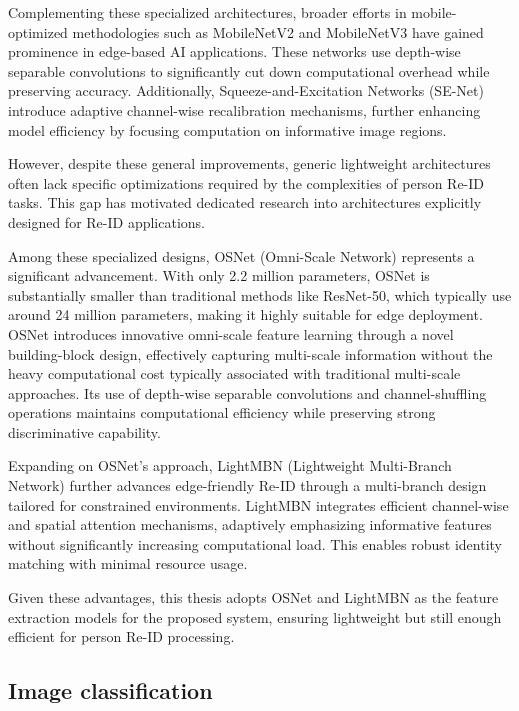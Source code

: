 \documentclass[../main.tex]{subfiles}
\begin{document}
Complementing these specialized architectures, broader efforts in mobile-optimized methodologies such as MobileNetV2 \cite{sandler2019mobilenetv2invertedresidualslinear} and MobileNetV3 \cite{howard2019searchingmobilenetv3} have gained prominence in edge-based AI applications. These networks use depth-wise separable convolutions to significantly cut down computational overhead while preserving accuracy. Additionally, Squeeze-and-Excitation Networks (SE-Net) \cite{hu2019squeezeandexcitationnetworks} introduce adaptive channel-wise recalibration mechanisms, further enhancing model efficiency by focusing computation on informative image regions.

However, despite these general improvements, generic lightweight architectures often lack specific optimizations required by the complexities of person Re-ID tasks. This gap has motivated dedicated research into architectures explicitly designed for Re-ID applications.

Among these specialized designs, OSNet (Omni-Scale Network) \cite{zhou2019omniscalefeaturelearningperson} represents a significant advancement. With only 2.2 million parameters, OSNet is substantially smaller than traditional methods like ResNet-50, which typically use around 24 million parameters, making it highly suitable for edge deployment. OSNet introduces innovative omni-scale feature learning through a novel building-block design, effectively capturing multi-scale information without the heavy computational cost typically associated with traditional multi-scale approaches. Its use of depth-wise separable convolutions and channel-shuffling operations maintains computational efficiency while preserving strong discriminative capability.

Expanding on OSNet's approach, LightMBN (Lightweight Multi-Branch Network) \cite{Herzog_2021} further advances edge-friendly Re-ID through a multi-branch design tailored for constrained environments. LightMBN integrates efficient channel-wise and spatial attention mechanisms, adaptively emphasizing informative features without significantly increasing computational load. This enables robust identity matching with minimal resource usage.

Given these advantages, this thesis adopts OSNet and LightMBN as the feature extraction models for the proposed system, ensuring lightweight but still enough efficient for person Re-ID processing.

\subsection{Image classification}
\label{sec:image_classification}
\end{document}
